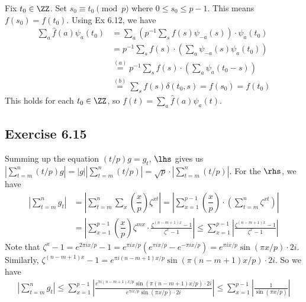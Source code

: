 \documentclass[../Chapter.tex]{subfiles}
\begin{document}
Fix $t_0\in\ZZ$. Set $s_0\equiv t_0 \pmod{p}$ where $0\leq s_0\leq p-1$. This means $f(s_0)=f(t_0)$. Using Ex 6.12, we have
\begin{align*}
\sum_a \hat{f}(a)\psi_a(t_0) &= \sum_a\left(p^{-1}\sum_s f(s)\psi_{-a}(s)\right)\cdot\psi_a(t_0) \\
&= p^{-1} \sum_s f(s)\cdot\left(\sum_a \psi_{-a}(s)\psi_a(t_0)\right) \\
&\overset{(a)}{=} p^{-1} \sum_s f(s)\cdot\left(\sum_a \psi_a(t_0-s)\right) \\
&\overset{(b)}{=} \sum_s f(s)\delta(t_0,s) = f(s_0)=f(t_0)
\end{align*}
This holds for each $t_0\in\ZZ$, so $f(t)=\sum_a \hat{f}(a)\psi_a(t)$.

\subsection*{Exercise 6.15}

Summing up the equation $(t/p)g=g_t$, $\lhs$ gives us $|\sum_{t=m}^n (t/p)g|=|g||\sum_{t=m}^n (t/p)|=\sqrt{p}\cdot|\sum_{t=m}^n (t/p)|$. For the $\rhs$, we have
\begin{align*}
\left|\sum_{t=m}^n g_t\right| &= \left|\sum_{t=m}^n \sum_x \left(\dfrac{x}{p}\right)\zeta^{xt}\right| = \left| \sum_{x=1}^{p-1} \left(\dfrac{x}{p}\right)\cdot\left(\sum_{t=m}^n \zeta^{xt}\right) \right| \\
&= \left|\sum_{x=1}^{p-1} \left(\dfrac{x}{p}\right)\zeta^{mx}\cdot\frac{\zeta^{(n-m+1)x}-1}{\zeta^x-1}\right| \leq \sum_{x=1}^{p-1} \left|\frac{\zeta^{(n-m+1)x}-1}{\zeta^x-1}\right|
\end{align*}
Note that $\zeta^x-1=e^{2\pi ix/p}-1=e^{\pi ix/p}(e^{\pi ix/p}-e^{-\pi ix/p})=e^{\pi ix/p}\sin(\pi x/p)\cdot2i$. Similarly, $\zeta^{(n-m+1)x}-1=e^{\pi i(n-m+1)x/p}\sin(\pi(n-m+1)x/p)\cdot2i$. So we have
\begin{align*}
\left|\sum_{t=m}^n g_t\right| \leq \sum_{x=1}^{p-1} \left|\frac{e^{\pi i(n-m+1)x/p}\sin(\pi(n-m+1)x/p)\cdot2i}{e^{\pi ix/p}\sin(\pi x/p)\cdot2i}\right| \leq \sum_{x=1}^{p-1} \left|\frac{1}{\sin(\pi x/p)}\right|
\end{align*}
\end{document}
